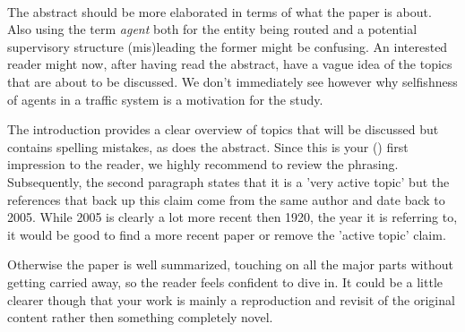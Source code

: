 \documentclass[../review.tex]{subfiles}
\begin{document}
\\
The abstract should be more elaborated in terms of what the paper is about. Also using the term \textit{agent} both for the entity being routed and a potential supervisory structure (mis)leading the former might be confusing. An interested reader might now, after having read the abstract, have a vague idea of the topics that are about to be discussed. We don't immediately see however why selfishness of agents in a traffic system is a motivation for the study.

The introduction provides a clear overview of topics that will be discussed but contains spelling mistakes, as does the abstract. Since this is your () first impression to the reader, we highly recommend to review the phrasing. Subsequently, the second paragraph states that it is a 'very active topic' but the references that back up this claim come from the same author and date back to 2005. While 2005 is clearly a lot more recent then 1920, the year it is referring to, it would be good to find a more recent paper or remove the 'active topic' claim.

Otherwise the paper is well summarized, touching on all the major parts without getting carried away, so the reader feels confident to dive in. It could be a little clearer though that your work is mainly a reproduction and revisit of the original content rather then something completely novel.
\end{document}
